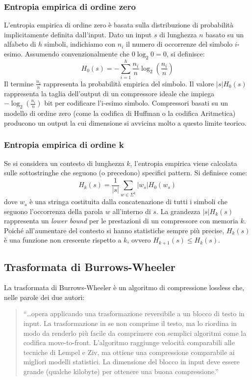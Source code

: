 \subsubsection{Entropia empirica di ordine zero}
L'entropia empirica di ordine zero è basata sulla distribuzione di probabilità implicitamente definita dall'input. Dato un input $s$ di lunghezza $n$ basato su un alfabeto di $h$ simboli, indichiamo con $n_i$ il numero di occorrenze del simbolo $i$-esimo. Assumendo convenzionalmente che $0 \log_2 0 = 0$, si definisce:
\[H_0(s) = -\sum_{i=1}^h \frac{n_i}{n} \log_2 \left(\frac{n_i}{n}\right)\]
Il termine $\frac{n_i}{n}$ rappresenta la probabilità empirica del simbolo. Il valore $|s|H_0(s)$ rappresenta la taglia dell'output di un compressore ideale che impiega $-\log_2\left(\frac{n_i}{n}\right)$ bit per codificare l'i-esimo simbolo. Compressori basati su un modello di ordine zero (come la codifica di Huffman o la codifica Aritmetica) producono un output la cui dimensione si avvicina molto a questo limite teorico.

\subsubsection{Entropia empirica di ordine k}
Se si considera un contesto di lunghezza $k$, l'entropia empirica viene calcolata sulle sottostringhe che seguono (o precedono) specifici pattern. Si definisce come:
\[H_k(s) = \frac{1}{|s|} \sum_{w \in \Sigma^k} |w_s| H_0(w_s)\]
dove $w_s$ è una stringa costituita dalla concatenazione di tutti i simboli che seguono l'occorrenza della parola $w$ all'interno di $s$. 
La grandezza $|s|H_k(s)$ rappresenta un \textit{lower bound} per le prestazioni di un compressore con memoria $k$. Poiché all'aumentare del contesto si hanno statistiche sempre più precise, $H_k(s)$ è una funzione non crescente rispetto a $k$, ovvero $H_{k+1}(s) \le H_k(s)$.


\subsection{Trasformata di Burrows-Wheeler}
La trasformata di Burrows-Wheeler è un algoritmo di compressione lossless che, nelle parole dei due autori:
\begin{quote}
``\dots opera  applicando una trasformazione reversibile a un blocco di testo in input. La trasformazione in se non comprime il testo, ma lo riordina in modo da renderlo più facile da comprimere con semplici algoritmi come la codifica move-to-front. L'algoritmo raggiunge velocità comparabili alle tecniche di Lempel e Ziv, ma ottiene una compressione comparabile ai migliori modelli statistici. La dimensione del blocco in input deve essere grande (qualche kilobyte) per ottenere una buona compressione.''
\end{quote}

